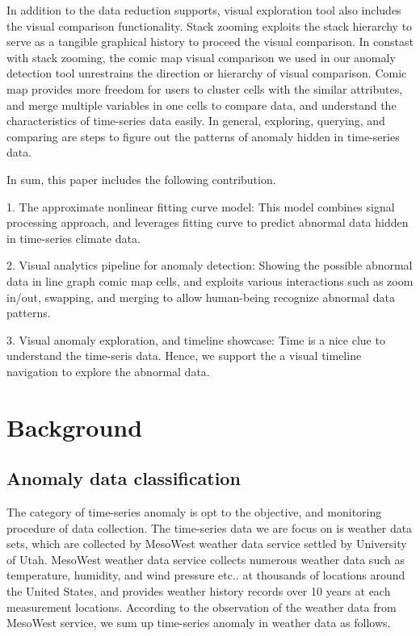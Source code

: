 \documentclass{vgtc}                          %
\begin{document}
	In addition to the data reduction supports, visual exploration tool also includes the visual comparison functionality. Stack zooming \cite{javed2010stack} exploits the stack hierarchy to serve as a tangible graphical history to proceed the visual comparison. In constast with stack zooming, the comic map visual comparison we used in our anomaly detection tool unrestrains the direction or hierarchy of visual comparison. Comic map provides more freedom for users to cluster cells with the similar attributes, and merge multiple variables in one cells to compare data, and understand the characteristics of time-series data easily. In general, exploring, querying, and comparing are steps to figure out the patterns of anomaly hidden in time-series data.
		
In sum, this paper includes the following contribution. 

1. The approximate nonlinear fitting curve model: This model combines signal processing approach, and leverages fitting curve to predict abnormal data hidden in time-series climate data.  
 
2. Visual analytics pipeline for anomaly detection: Showing the possible abnormal data in line graph comic map cells, and exploits various interactions such as zoom in/out, swapping, and merging to allow human-being recognize abnormal data patterns.

3. Visual anomaly exploration, and timeline showcase: Time is a nice clue to understand the time-seris data. Hence, we support the a visual timeline navigation to explore the abnormal data.    

\section{Background}

\subsection{Anomaly data classification}

The category of time-series anomaly is opt to the objective, and monitoring procedure of data collection. The time-series data we are focus on is weather data sets, which are collected by MesoWest weather data service settled by University of Utah. MesoWest weather data service collects numerous weather data such as temperature, humidity, and wind pressure etc.. at thousands of locations around the United States, and provides weather history records over 10 years at each measurement locations. According to the observation of the weather data from MesoWest service, we sum up time-series anomaly in weather data as follows.
\end{document}
